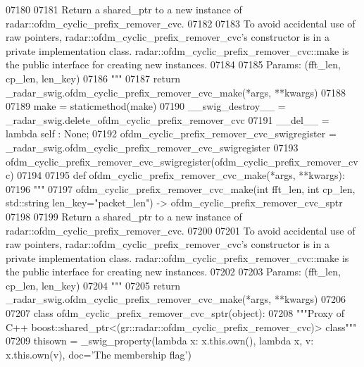 \begin{DoxyCode}
{{{{{{{{{{{{{{{{{{{{{{{{07180 \textcolor{stringliteral}{}
07181 \textcolor{stringliteral}{        Return a shared\_ptr to a new instance of radar::ofdm\_cyclic\_prefix\_remover\_cvc.}
07182 \textcolor{stringliteral}{}
07183 \textcolor{stringliteral}{        To avoid accidental use of raw pointers, radar::ofdm\_cyclic\_prefix\_remover\_cvc's constructor is in
       a private implementation class. radar::ofdm\_cyclic\_prefix\_remover\_cvc::make is the public interface for
       creating new instances.}
07184 \textcolor{stringliteral}{}
07185 \textcolor{stringliteral}{        Params: (fft\_len, cp\_len, len\_key)}
07186 \textcolor{stringliteral}{        """}
07187         \textcolor{keywordflow}{return} \_radar\_swig.ofdm\_cyclic\_prefix\_remover\_cvc\_make(*args, **kwargs)
07188 
07189     make = staticmethod(make)
07190     \_\_swig\_destroy\_\_ = \_radar\_swig.delete\_ofdm\_cyclic\_prefix\_remover\_cvc
07191     \_\_del\_\_ = \textcolor{keyword}{lambda} self : \textcolor{keywordtype}{None};
07192 ofdm\_cyclic\_prefix\_remover\_cvc\_swigregister = \_radar\_swig.ofdm\_cyclic\_prefix\_remover\_cvc\_swigregister
07193 ofdm_cyclic_prefix_remover_cvc_swigregister(ofdm\_cyclic\_prefix\_remover\_cvc)
07194 
07195 \textcolor{keyword}{def }ofdm_cyclic_prefix_remover_cvc_make(*args, **kwargs):
07196   \textcolor{stringliteral}{"""}
07197 \textcolor{stringliteral}{    ofdm\_cyclic\_prefix\_remover\_cvc\_make(int fft\_len, int cp\_len, std::string len\_key="packet\_len") ->
       ofdm\_cyclic\_prefix\_remover\_cvc\_sptr}
07198 \textcolor{stringliteral}{}
07199 \textcolor{stringliteral}{    Return a shared\_ptr to a new instance of radar::ofdm\_cyclic\_prefix\_remover\_cvc.}
07200 \textcolor{stringliteral}{}
07201 \textcolor{stringliteral}{    To avoid accidental use of raw pointers, radar::ofdm\_cyclic\_prefix\_remover\_cvc's constructor is in a
       private implementation class. radar::ofdm\_cyclic\_prefix\_remover\_cvc::make is the public interface for creating
       new instances.}
07202 \textcolor{stringliteral}{}
07203 \textcolor{stringliteral}{    Params: (fft\_len, cp\_len, len\_key)}
07204 \textcolor{stringliteral}{    """}
07205   \textcolor{keywordflow}{return} \_radar\_swig.ofdm\_cyclic\_prefix\_remover\_cvc\_make(*args, **kwargs)
07206 
07207 \textcolor{keyword}{class }ofdm_cyclic_prefix_remover_cvc_sptr(object):
07208     \textcolor{stringliteral}{"""Proxy of C++ boost::shared\_ptr<(gr::radar::ofdm\_cyclic\_prefix\_remover\_cvc)> class"""}
07209     thisown = _swig_property(\textcolor{keyword}{lambda} x: x.this.own(), \textcolor{keyword}{lambda} x, v: x.this.own(v), doc=\textcolor{stringliteral}{'The membership flag'})
}}}}}}}}}}}}}}}}}}}}}}}}
\end{DoxyCode}
